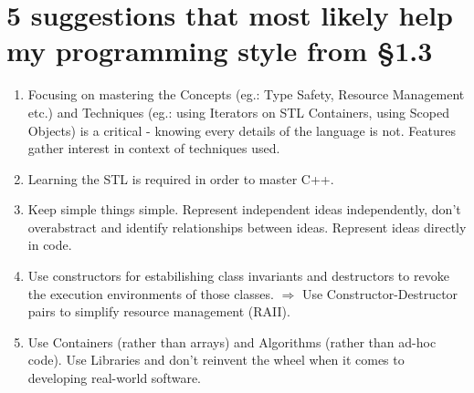 \documentclass{article}
\begin{document}
 \section*{5  suggestions that most likely help my programming style from \S1.3}
 \begin{enumerate}
  \item Focusing on mastering the Concepts (eg.: Type Safety, Resource Management etc.) and Techniques (eg.: using Iterators on STL Containers, using Scoped Objects)
  is a critical - knowing every details of the language is not.
  Features gather interest in context of techniques used.
  \item Learning the STL is required in order to master C++.
  \item Keep simple things simple. Represent independent ideas independently, don't overabstract and identify relationships between ideas.
  Represent ideas directly in code.
  \item Use constructors for estabilishing class invariants and destructors to revoke the execution environments of those classes.
  $\Rightarrow$ Use Constructor-Destructor pairs to simplify resource management (RAII).
  \item Use Containers (rather than arrays) and Algorithms (rather than ad-hoc code).
  Use Libraries and don't reinvent the wheel when it comes to developing real-world software.
  
 \end{enumerate}
\end{document}
